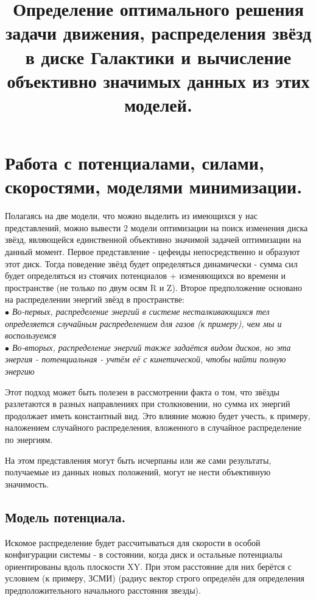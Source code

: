 \documentclass[a4paper,12pt]{article}
\begin{document}
\title{Определение оптимального решения задачи движения, распределения звёзд в диске Галактики и вычисление объективно значимых данных из этих моделей.}
\maketitle
\section{Работа с потенциалами, силами, скоростями, моделями минимизации.}
Полагаясь на две модели, что можно выделить из имеющихся у нас представлений, можно вывести 2 модели оптимизации на поиск изменения диска звёзд, являющейся единственной объективно значимой задачей оптимизации на данный момент. Первое представление - цефеиды непосредственно и образуют этот диск. Тогда поведение звёзд будет определяться динамически - сумма сил будет определяться из стоячих потенциалов + изменяющихся во времени и пространстве (не только по двум осям R и Z). Второе предположение основано на распределении энергий звёзд в пространстве:\\
\textit{$\bullet$ Во-первых, распределение энергий в системе несталкивающихся тел определяется случайным распределением для газов (к примеру), чем мы и воспользуемся}\\
\textit{$\bullet$ Во-вторых, распределение энергий также задаётся видом дисков, но эта энергия - потенциальная - учтём её с кинетической, чтобы найти полную энергию}

Этот подход может быть полезен в рассмотрении факта о том, что звёзды разлетаются в разных направлениях при столкновении, но сумма их энергий продолжает иметь константный вид. Это влияние можно будет учесть, к примеру, наложением случайного распределения, вложенного в случайное распределение по энергиям.

На этом представления могут быть исчерпаны или же сами результаты, получаемые из данных новых положений, могут не нести объективную значимость.

\subsection{Модель потенциала.}
Искомое распределение будет рассчитываться для скорости в особой конфигурации системы - в состоянии, когда диск и остальные потенциалы ориентированы вдоль плоскости XY. При этом расстояние для них берётся с условием (к примеру, ЗСМИ) (радиус вектор строго определён для определения предположительного начального расстояния звезды).
\end{document}
